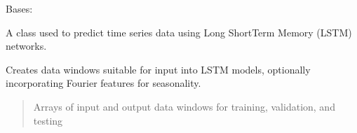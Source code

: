 \documentclass[letterpaper,10pt,english]{sphinxmanual}
\begin{document}
\begin{fulllineitems}
\label{\detokenize{docs/LSTM_model:LSTM_model.LSTM_Predictor}}
\pysigstartsignatures
{}
\pysigstopsignatures
\sphinxAtStartPar
Bases: 

\sphinxAtStartPar
A class used to predict time series data using Long Short\sphinxhyphen{}Term Memory (LSTM) networks.

\begin{fulllineitems}
\label{\detokenize{docs/LSTM_model:LSTM_model.LSTM_Predictor.data_windowing}}
\pysigstartsignatures
{}
\pysigstopsignatures
\sphinxAtStartPar
Creates data windows suitable for input into LSTM models, optionally incorporating Fourier features for seasonality.
\begin{quote}\begin{description}
\sphinxAtStartPar
Arrays of input and output data windows for training, validation, and testing

\end{description}\end{quote}

\end{fulllineitems}



\end{fulllineitems}
\end{document}

